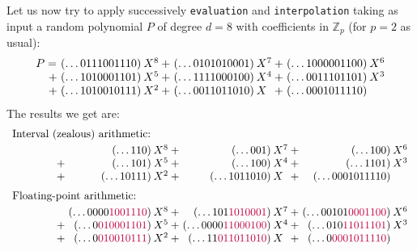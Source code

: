 \documentclass[11pt]{article}
\numberwithin{equation}{section}
\numberwithin{figure}{section}
\theoremstyle{definition}
\newcommand{\Z}{\mathbb Z}
\newcommand{\Zp}{\Z_p}
\begin{document}
Let us now try to apply successively \texttt{evaluation} and
\texttt{interpolation} taking as input a random polynomial $P$ of 
degree $d=8$ with coefficients in $\Zp$ (for $p = 2$ as usual):
$$\begin{array}{r@{\hspace{0.2ex}}r@{\hspace{0.5ex}}l@{\hspace{0.2ex}}r@{\hspace{0.5ex}}l@{\hspace{0.2ex}}r@{\hspace{0.5ex}}l}
P = {}& (\ldots 0111001110) & X^8 
  + {}& (\ldots 0101010001) & X^7 
  + {}& (\ldots 1000001100) & X^6 \\
{}+ {}& (\ldots 1010001101) & X^5 
  + {}& (\ldots 1111000100) & X^4
  + {}& (\ldots 0011101101) & X^3 \\
{}+ {}& (\ldots 1010010111) & X^2
  + {}& (\ldots 0011011010) & X^{\phantom{1}} 
  + {}& (\ldots 0001011110) 
\end{array}$$
The results we get are:
$$\begin{array}{cr@{\hspace{0.2ex}}r@{\hspace{0.5ex}}l@{\hspace{0.2ex}}r@{\hspace{0.5ex}}l@{\hspace{0.2ex}}r@{\hspace{0.5ex}}l}
\multicolumn{8}{l}{\text{Interval (zealous) arithmetic:}}\smallskip\\
\hspace{1cm}\null
&    {}& (\ldots 110) & X^8 
   + {}& (\ldots 001) & X^7 
   + {}& (\ldots 100) & X^6 \\
&{}+ {}& (\ldots 101) & X^5 
   + {}& (\ldots 100) & X^4
   + {}& (\ldots 1101) & X^3 \\
&{}+ {}& (\ldots 10111) & X^2
   + {}& (\ldots 1011010) & X^{\phantom{1}} 
   + {}& (\ldots 0001011110) \medskip \\
\multicolumn{8}{l}{\text{Floating-point arithmetic:}}\smallskip\\
\hspace{1cm}\null
&    {}& (\ldots 0000{\color{purple}1001110}) & X^8 
   + {}& (\ldots 101{\color{purple}1010001}) & X^7 
   + {}& (\ldots 00101{\color{purple}0001100}) & X^6 \\
&{}+ {}& (\ldots 0{\color{purple}010001101}) & X^5 
   + {}& (\ldots 0000{\color{purple}11000100}) & X^4
   + {}& (\ldots 010{\color{purple}11011101}) & X^3 \\
&{}+ {}& (\ldots 0{\color{purple}010010111}) & X^2
   + {}& (\ldots 11{\color{purple}011011010}) & X^{\phantom{1}} 
   + {}& (\ldots 0{\color{purple}0001011110}) 
\end{array}$$
\end{document}
